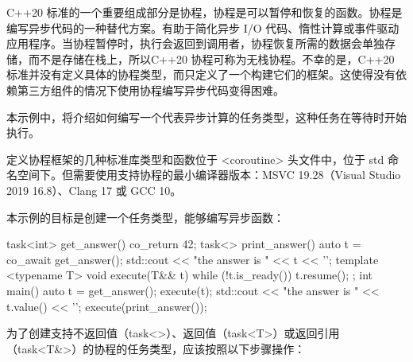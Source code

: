 
C++20 标准的一个重要组成部分是协程，协程是可以暂停和恢复的函数。协程是编写异步代码的一种替代方案。有助于简化异步 I/O 代码、惰性计算或事件驱动应用程序。当协程暂停时，执行会返回到调用者，协程恢复所需的数据会单独存储，而不是存储在栈上，所以C++20 协程可称为无栈协程。不幸的是，C++20 标准并没有定义具体的协程类型，而只定义了一个构建它们的框架。这使得没有依赖第三方组件的情况下使用协程编写异步代码变得困难。

本示例中，将介绍如何编写一个代表异步计算的任务类型，这种任务在等待时开始执行。


定义协程框架的几种标准库类型和函数位于 <coroutine> 头文件中，位于 std 命名空间下。但需要使用支持协程的最小编译器版本：MSVC 19.28（Visual Studio 2019 16.8）、Clang 17 或 GCC 10。

本示例的目标是创建一个任务类型，能够编写异步函数：

\begin{cpp}
task<int> get_answer()
{
    co_return 42;
}
task<> print_answer()
{
    auto t = co_await get_answer();
    std::cout << "the answer is " << t << '\n';
}
template <typename T>
void execute(T&& t)
{
    while (!t.is_ready()) t.resume();
};
int main()
{
    auto t = get_answer();
    execute(t);
    std::cout << "the answer is " << t.value() << '\n';
    execute(print_answer());
}
\end{cpp}


为了创建支持不返回值（task<>）、返回值（task<T>）或返回引用（task<T\&>）的协程的任务类型，应该按照以下步骤操作：

